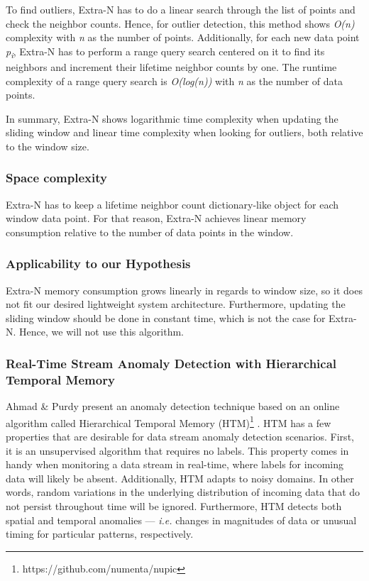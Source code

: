 To find outliers, Extra-N has to do a linear search through the list of points and check the neighbor counts. Hence, for outlier detection, this method shows \textit{O(n)} complexity with \textit{n} as the number of points. Additionally, for each new data point \textit{p\textsubscript{i}}, Extra-N has to perform a range query search centered on it to find its neighbors and increment their lifetime neighbor counts by one. The runtime complexity of a range query search is \textit{O(log(n))} \cite{range-query-log} with \textit{n} as the number of data points.

In summary, Extra-N shows logarithmic time complexity when updating the sliding window and linear time complexity when looking for outliers, both relative to the window size.


\subsubsection*{Space complexity}
Extra-N has to keep a lifetime neighbor count dictionary-like object for each window data point. For that reason, Extra-N achieves linear memory consumption relative to the number of data points in the window.

\subsubsection*{Applicability to our Hypothesis}
Extra-N memory consumption grows linearly in regards to window size, so it does not fit our desired lightweight system architecture. Furthermore, updating the sliding window should be done in constant time, which is not the case for Extra-N. Hence, we will not use this algorithm.

\subsubsection{Real-Time Stream Anomaly Detection with Hierarchical Temporal Memory}
Ahmad \& Purdy present an anomaly detection technique based on an online algorithm called Hierarchical Temporal Memory (HTM)\footnote{https://github.com/numenta/nupic} \cite{Ahmad-HTM}. HTM has a few properties that are desirable for data stream anomaly detection scenarios. First, it is an unsupervised algorithm that requires no labels. This property comes in handy when monitoring a data stream in real-time, where labels for incoming data will likely be absent. Additionally, HTM adapts to noisy domains. In other words, random variations in the underlying distribution of incoming data that do not persist throughout time will be ignored. Furthermore, HTM detects both spatial and temporal anomalies --- \textit{i.e.} changes in magnitudes of data or unusual timing for particular patterns, respectively.   

